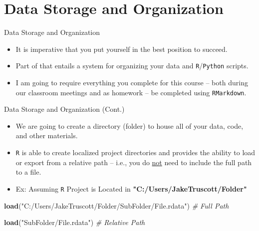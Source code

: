 \documentclass[
  ignorenonframetext,
]{beamer}
\newenvironment{Shaded}{\begin{snugshade}}{\end{snugshade}}
\newcommand{\CommentTok}[1]{\textcolor[rgb]{0.56,0.35,0.01}{\textit{#1}}}
\newcommand{\FunctionTok}[1]{\textcolor[rgb]{0.13,0.29,0.53}{\textbf{#1}}}
\newcommand{\NormalTok}[1]{#1}
\newcommand{\StringTok}[1]{\textcolor[rgb]{0.31,0.60,0.02}{#1}}
\providecommand{\tightlist}{%
  \setlength{\itemsep}{0pt}\setlength{\parskip}{0pt}}
\begin{document}
\section{Data Storage and
Organization}\label{data-storage-and-organization}

\begin{frame}{Data Storage and Organization}
\label{data-storage-and-organization-1}
\begin{itemize}
\tightlist
\item
  It is imperative that you put yourself in the best position to
  succeed.

  \par \vspace{2.5mm}
\item
  Part of that entails a system for organizing your data and
  \texttt{R}/\texttt{Python} scripts.

  \par \vspace{2.5mm}
\item
  I am going to require everything you complete for this course -- both
  during our classroom meetings and as homework -- be completed using
  \texttt{RMarkdown}.
\end{itemize}
\end{frame}

\begin{frame}[fragile]{Data Storage and Organization (Cont.)}
\label{data-storage-and-organization-cont.}
\begin{itemize}

\item We are going to create a directory (folder) to house all of your data, code, and other materials. \par \vspace{2.5mm}

\item \texttt{R} is able to create localized project directories and provides the ability to load or export from a relative path -- i.e., you do \underline{not} need to include the full path to a file.  \par \vspace{2.5mm}

\item Ex: Assuming \texttt{R} Project is Located in \footnotesize{\textbf{"C:/Users/JakeTruscott/Folder"}}

\end{itemize}

\footnotesize

\begin{Shaded}
\begin{Highlighting}[]
\FunctionTok{load}\NormalTok{(}\StringTok{"C:/Users/JakeTruscott/Folder/SubFolder/File.rdata"}\NormalTok{)}
\CommentTok{\# Full Path}

\FunctionTok{load}\NormalTok{(}\StringTok{"SubFolder/File.rdata"}\NormalTok{)}
\CommentTok{\# Relative Path}
\end{Highlighting}
\end{Shaded}
\end{frame}
\end{document}
